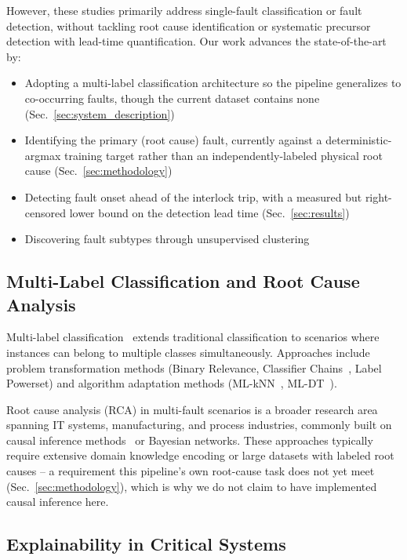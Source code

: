 However, these studies primarily address single-fault classification or fault detection, without tackling root cause identification or systematic precursor detection with lead-time quantification. Our work advances the state-of-the-art by:
\begin{itemize}
    \item Adopting a multi-label classification architecture so the pipeline generalizes to co-occurring faults, though the current dataset contains none (Sec.~\ref{sec:system_description})
    \item Identifying the primary (root cause) fault, currently against a deterministic-argmax training target rather than an independently-labeled physical root cause (Sec.~\ref{sec:methodology})
    \item Detecting fault onset ahead of the interlock trip, with a measured but right-censored lower bound on the detection lead time (Sec.~\ref{sec:results})
    \item Discovering fault subtypes through unsupervised clustering
\end{itemize}

\subsection{Multi-Label Classification and Root Cause Analysis}

Multi-label classification~\cite{multilabel_survey} extends traditional classification to scenarios where instances can belong to multiple classes simultaneously. Approaches include problem transformation methods (Binary Relevance, Classifier Chains~\cite{classifier_chains}, Label Powerset) and algorithm adaptation methods (ML-kNN~\cite{mlknn}, ML-DT~\cite{mldt}).

Root cause analysis (RCA) in multi-fault scenarios is a broader research area spanning IT systems, manufacturing, and process industries, commonly built on causal inference methods~\cite{pearl_causality} or Bayesian networks. These approaches typically require extensive domain knowledge encoding or large datasets with labeled root causes -- a requirement this pipeline's own root-cause task does not yet meet (Sec.~\ref{sec:methodology}), which is why we do not claim to have implemented causal inference here.

\subsection{Explainability in Critical Systems}


